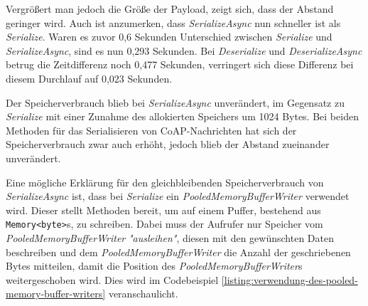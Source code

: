 \begin{table}[h]
    \caption{Benchmark mit 0 Options und mit einer Payload von 1000 Bytes}
    \label{tab:benchmark-0-1000}
\end{table}

Vergrößert man jedoch die Größe der Payload, zeigt sich, dass der Abstand geringer wird. Auch ist anzumerken, dass \textit{SerializeAsync} nun schneller ist als \textit{Serialize}. Waren es zuvor 0,6 Sekunden Unterschied zwischen \textit{Serialize} und \textit{SerializeAsync}, sind es nun 0,293 Sekunden. Bei \textit{Deserialize} und \textit{DeserializeAsync} betrug die Zeitdifferenz noch 0,477 Sekunden, verringert sich diese Differenz bei diesem Durchlauf auf 0,023 Sekunden.

Der Speicherverbrauch blieb bei \textit{SerializeAsync} unverändert, im Gegensatz zu \textit{Serialize} mit einer Zunahme des allokierten Speichers um 1024 Bytes. Bei beiden Methoden für das Serialisieren von CoAP-Nachrichten hat sich der Speicherverbrauch zwar auch erhöht, jedoch blieb der Abstand zueinander unverändert.

Eine mögliche Erklärung für den gleichbleibenden Speicherverbrauch von \textit{SerializeAsync} ist, dass bei \textit{Serialize} ein \textit{PooledMemoryBufferWriter} verwendet wird. Dieser stellt Methoden bereit, um auf einem Puffer, bestehend aus \texttt{Memory<byte>}s, zu schreiben. Dabei muss der Aufrufer nur Speicher vom \textit{PooledMemoryBufferWriter} \textit{"ausleihen"}, diesen mit den gewünschten Daten beschreiben und dem \textit{PooledMemoryBufferWriter} die Anzahl der geschriebenen Bytes mitteilen, damit die Position des \textit{PooledMemoryBufferWriter}s weitergeschoben wird. Dies wird im Codebeispiel \ref{listing:verwendung-des-pooled-memory-buffer-writers} veranschaulicht.

